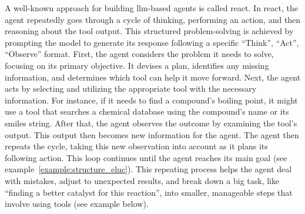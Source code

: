 A well-known approach for building \gls{llm}-based agents is called \gls{react}\autocite{yao2023react}. In \gls{react}, the agent repeatedly goes through a cycle of thinking, performing an action, and then reasoning about the tool output. 
This structured problem-solving is achieved by prompting the model to generate its response following a specific \enquote{Think}, \enquote{Act}, \enquote{Observe} format.
First, the agent considers the problem it needs to solve, focusing on its primary objective. It devises a plan, identifies any missing information, and determines which tool can help it move forward. Next, the agent acts by selecting and utilizing the appropriate tool with the necessary information. For instance, if it needs to find a compound's boiling point, it might use a tool that searches a chemical database using the compound's name or its \gls{smiles} string. After that, the agent observes the outcome by examining the tool's output. This output then becomes new information for the agent. The agent then repeats the cycle, taking this new observation into account as it plans its following action. This loop continues until the agent reaches its main goal (see example~\ref{example:structure_eluc}). This repeating process helps the agent deal with mistakes, adjust to unexpected results, and break down a big task, like \enquote{finding a better catalyst for this reaction}, into smaller, manageable steps that involve using tools (see example below).


